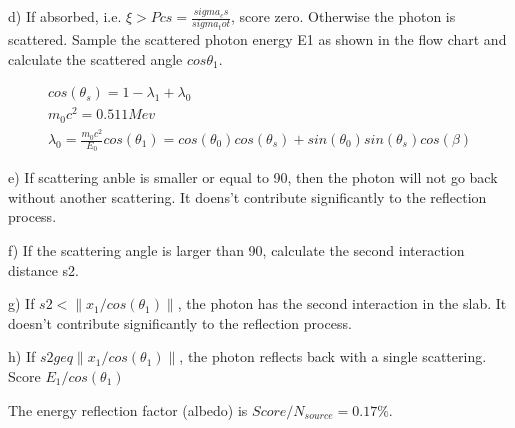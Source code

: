 \documentclass[paper=a4, fontsize=11pt]{article} %
\begin{document}
d) If absorbed, i.e. $\xi > Pcs = \frac{sigma_cs}{sigma_tot}$, score zero. Otherwise the photon is scattered. Sample the scattered photon energy E1 as shown in the flow chart and calculate the scattered angle $cos\theta _1$.

\begin{eqnarray}
cos(\theta_s) = 1 - \lambda_1 + \lambda_0\\
m_0 c^2 = 0.511 Mev\\
\lambda_0 = \frac{m_0 c^2}{E_0}
cos(\theta_1) = cos(\theta_0) cos(\theta _ s) + sin(\theta_0) sin(\theta _ s) cos(\beta)
\end{eqnarray}

e) If scattering anble is smaller or equal to 90, then the photon will not go back without another scattering. It doens't contribute significantly to the reflection process.

f) If the scattering angle is larger than 90, calculate the second interaction distance s2.

g) If $s2 < \|x_1/cos(\theta_1)\|$, the photon has the second interaction in the slab. It doesn't contribute significantly to the reflection process.

h) If $s2 geq\|x_1/cos(\theta_1)\|$, the photon reflects back with a single scattering. Score $E_1/ cos(\theta_1)$

The energy reflection factor (albedo) is $Score/ N_{source} = 0.17\% $. 
\end{document}
